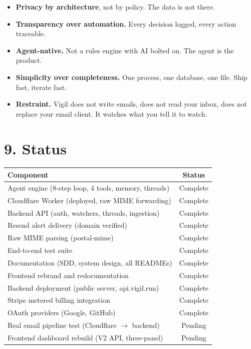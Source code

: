 \documentclass[10pt]{article}
\begin{document}
\begin{itemize}[nosep]
  \item \textbf{Privacy by architecture}, not by policy. The data is not there.
  \item \textbf{Transparency over automation.} Every decision logged, every action traceable.
  \item \textbf{Agent-native.} Not a rules engine with AI bolted on. The agent is the product.
  \item \textbf{Simplicity over completeness.} One process, one database, one file. Ship fast, iterate fast.
  \item \textbf{Restraint.} Vigil does not write emails, does not read your inbox, does not replace your email client. It watches what you tell it to watch.
\end{itemize}

\section*{9. Status}

\begin{center}
\begin{tabular}{lc}
\toprule
\textbf{Component} & \textbf{Status} \\
\midrule
Agent engine (8-step loop, 4 tools, memory, threads) & Complete \\
Cloudflare Worker (deployed, raw MIME forwarding) & Complete \\
Backend API (auth, watchers, threads, ingestion) & Complete \\
Resend alert delivery (domain verified) & Complete \\
Raw MIME parsing (postal-mime) & Complete \\
End-to-end test suite & Complete \\
Documentation (SDD, system design, all READMEs) & Complete \\
Frontend rebrand and redocumentation & Complete \\
Backend deployment (public server, api.vigil.run) & Complete \\
Stripe metered billing integration & Complete \\
OAuth providers (Google, GitHub) & Complete \\
Real email pipeline test (Cloudflare $\rightarrow$ backend) & Pending \\
Frontend dashboard rebuild (V2 API, three-panel) & Pending \\
\bottomrule
\end{tabular}
\end{center}
\end{document}
